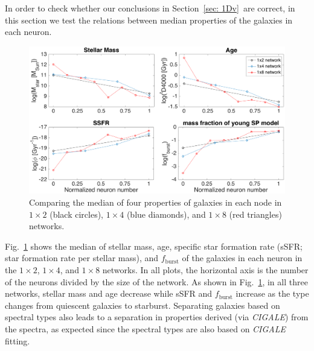         In order to check whether our conclusions in Section~\ref{sec: 1Dv}~are correct, in this section we test the relations between median properties of the galaxies in each neuron.
        
        \begin{figure}
            \centering
            \includegraphics[width=\textwidth]{../image_paper2/1d/props5.png}
            \caption[The median of four properties of galaxies in three networks]{Comparing the median of four properties of galaxies in each node in $1\times2$ (black circles), $1\times4$ (blue diamonds), and $1\times8$ (red triangles) networks.}
            \label{fig: props}
        \end{figure}
       
        Fig.~\ref{fig: props} shows the median of stellar mass, age, specific star formation rate (sSFR; star formation rate per stellar mass), and $f_\mathrm{burst}$ of the galaxies in each neuron in the $1\times2$, $1\times4$, and $1\times8$ networks.
        In all plots, the horizontal axis is the number of the neurons divided by the size of the network.%
%        
        As shown in Fig.~\ref{fig: props}, in all three networks, stellar mass and age decrease while sSFR and $f_\mathrm{burst}$ increase as the type changes from quiescent galaxies to starburst. 
       Separating galaxies based on spectral types also leads to a separation in properties derived (via {\em CIGALE}) from the spectra, as expected since the spectral types are also based on {\em CIGALE} fitting. 
    


